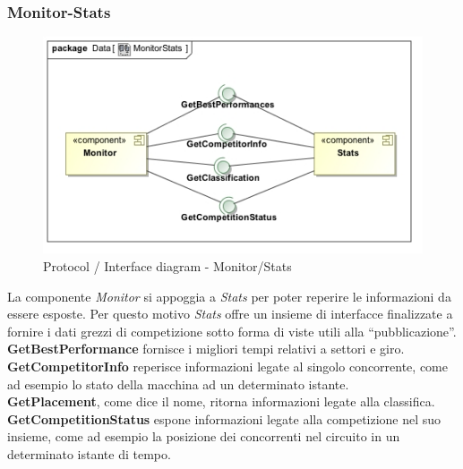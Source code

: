 \subsubsection{Monitor-Stats}
\begin{center}
\begin{figure}[h!]
	\includegraphics[scale=0.55]{img/InteractionDiagram/Implementation_Diagram__MonitorStats.jpg}
\caption{Protocol / Interface diagram - Monitor/Stats}
\end{figure}
\end{center}
La componente \emph{Monitor} si appoggia a \emph{Stats} per poter reperire le informazioni da essere esposte. Per questo motivo
\emph{Stats} offre un insieme di interfacce finalizzate a fornire i dati grezzi di competizione sotto forma di viste utili alla ``pubblicazione''.\\
\textbf{GetBestPerformance} fornisce i migliori tempi relativi a settori e giro.\\
\textbf{GetCompetitorInfo} reperisce informazioni legate al singolo concorrente, come ad esempio lo stato della macchina ad un determinato istante.\\
\textbf{GetPlacement}, come dice il nome, ritorna informazioni legate alla classifica.\\
\textbf{GetCompetitionStatus} espone informazioni legate alla competizione nel suo insieme, come ad esempio la posizione dei concorrenti nel circuito
in un determinato istante di tempo.
\clearpage
